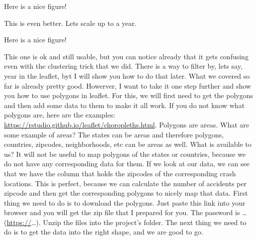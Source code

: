 \documentclass[]{book}
\newenvironment{Shaded}{\begin{snugshade}}{\end{snugshade}}
\newcommand{\CommentTok}[1]{\textcolor[rgb]{0.56,0.35,0.01}{\textit{#1}}}
\newcommand{\DataTypeTok}[1]{\textcolor[rgb]{0.13,0.29,0.53}{#1}}
\newcommand{\DecValTok}[1]{\textcolor[rgb]{0.00,0.00,0.81}{#1}}
\newcommand{\FloatTok}[1]{\textcolor[rgb]{0.00,0.00,0.81}{#1}}
\newcommand{\KeywordTok}[1]{\textcolor[rgb]{0.13,0.29,0.53}{\textbf{#1}}}
\newcommand{\NormalTok}[1]{#1}
\newcommand{\OperatorTok}[1]{\textcolor[rgb]{0.81,0.36,0.00}{\textbf{#1}}}
\newcommand{\StringTok}[1]{\textcolor[rgb]{0.31,0.60,0.02}{#1}}
\begin{document}
\hypertarget{htmlwidget-5934aca00a8c2b08ff65}{}

\label{fig:nice-fig83}Here is a nice figure!

This is even better. Lets scale up to a year.

\begin{Shaded}
\end{Shaded}

\hypertarget{htmlwidget-e2dae6e1fda6bad8de5c}{}

\label{fig:nice-fig84}Here is a nice figure!

This one is ok and still usable, but you can notice already that it gets confusing even with the clustering trick that we did. There is a way to filter by, lets say, year in the leaflet, byt I will show you how to do that later. What we covered so far is already pretty good. Howerver, I want to take it one step further and show you how to use polygons in leaflet. For this, we will first need to get the polygons and then add some data to them to make it all work. If you do not know what polygons are, here are the examples: \url{https://rstudio.github.io/leaflet/choropleths.html}. Polygons are areas. What are some example of areas? The states can be areas and therefore polygons, countries, zipcodes, neighborhoods, etc can be areas as well. What is available to us? It will not be useful to map polygons of the states or countries, because we do not have any corresponding data for them. If we look at our data, we can see that we have the column that holds the zipcodes of the corresponding crash locations. This is perfect, because we can calculate the number of accidents per zipcode and then get the corresponding polygons to nicely map that data. First thing we need to do is to download the polygons. Just paste this link into your browser and you will get the zip file that I prepared for you. The password is \ldots{} (\url{https://}\ldots{}). Unzip the files into the project's folder. The next thing we need to do is to get the data into the right shape, and we are good to go.
\end{document}
